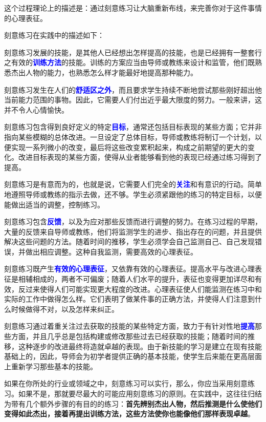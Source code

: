 \documentclass[12pt,oneside]{book}
\renewcommand{\emph}[1]{\textcolor{blue}{\textbf{#1}}}
\begin{document}
这个过程理论上的描述是：通过刻意练习让大脑重新布线，来完善你对于这件事情的心理表征。

刻意练习在实践中的描述如下：

\begin{bookref}[frametitle={\cite{刻意练习}}]
刻意练习发展的技能，是其他人已经想出怎样提高的技能，也是已经拥有一整套行之有效的\emph{训练方法}的技能。训练的方案应当由导师或教练来设计和监管，他们既熟悉杰出人物的能力，也熟悉怎么样才能最好地提高那种能力。

刻意练习发生在人们的\emph{舒适区之外}，而且要求学生持续不断地尝试那些刚好超出他当前能力范围的事物。因此，它需要人们付出近乎最大限度的努力。一般来讲，这并不令人心情愉快。

刻意练习包含得到良好定义的特定\emph{目标}，通常还包括目标表现的某些方面；它并非指向某些模糊的总体改进。一旦设定了总体目标，导师或教练将制订一个计划，以便实现一系列微小的改变，最后将这些改变累积起来，构成之前期望的更大的变化。改进目标表现的某些方面，使得从业者能够看到他的表现已经通过练习得到了提高。

刻意练习是有意而为的，也就是说，它需要人们完全的\emph{关注}和有意识的行动。简单地遵照导师或教练的指示去做，还不够。学生必须紧跟他的练习的特定目标，以便能做出适当的调整，控制练习。

刻意练习包含\emph{反馈}，以及为应对那些反馈而进行调整的努力。在练习过程的早期，大量的反馈来自导师或教练，他们将监测学生的进步、指出存在的问题，并且提供解决这些问题的方法。随着时间的推移，学生必须学会自己监测自己、自己发现错误，并做出相应调整。这种自我监测，需要高效的心理表征。

刻意练习既产生\emph{有效的心理表征}，又依靠有效的心理表征。提高水平与改进心理表征是相辅相成的，两者不可偏废；随着人们水平的提升，表征也变得更加详尽和有效，反过来使得人们可能实现更大程度的改进。心理表征使人们能监测在练习中和实际的工作中做得怎么样。它们表明了做某件事的正确方法，并使得人们注意到什么时候做得不对，以及怎样来纠正。

刻意练习通过着重关注过去获取的技能的某些特定方面，致力于有针对性地\emph{提高}那些方面，并且几乎总是包括构建或修改那些过去已经获取的技能；随着时间的推移，这种逐步的改进最终将造就卓越的表现。由于新技能的学习是建立在现有技能基础上的，因此，导师会为初学者提供正确的基本技能，使学生后来能在更高层面上重新学习那些基本的技能。
\end{bookref}


如果在你所处的行业或领域之中，刻意练习可以实行，那么，你应当采用刻意练习。如果不是，那就要尽最大的可能应用刻意练习的原则。在实践中，这往往归结为带有几个额外步骤的有目的的练习：\textbf{首先辨别杰出人物，然后推测是什么使他们变得如此杰出，接着再提出训练方法，这些方法使你也能像他们那样表现卓越}。
\end{document}
